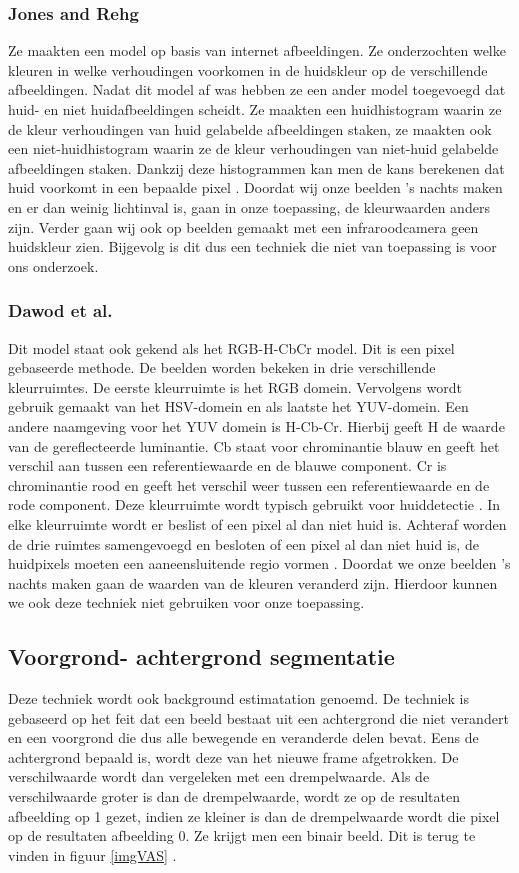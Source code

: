 \subsubsection{Jones and Rehg}
Ze maakten een model op basis van internet afbeeldingen. Ze onderzochten welke kleuren in welke verhoudingen voorkomen in de huidskleur op de verschillende afbeeldingen. Nadat dit model af was hebben ze een ander model toegevoegd dat huid- en niet huidafbeeldingen scheidt. Ze maakten een huidhistogram waarin ze de kleur verhoudingen van huid gelabelde afbeeldingen staken, ze maakten ook een niet-huidhistogram waarin ze de kleur verhoudingen van niet-huid gelabelde afbeeldingen staken. Dankzij deze histogrammen kan men de kans berekenen dat huid voorkomt in een bepaalde pixel \cite{bibTHK}. Doordat wij onze beelden 's nachts maken en er dan weinig lichtinval is, gaan in onze toepassing, de kleurwaarden anders zijn. Verder gaan wij ook op beelden gemaakt met een infraroodcamera geen huidskleur zien. Bijgevolg is dit dus een techniek die niet van toepassing is voor ons onderzoek. 

\subsubsection{Dawod et al.}
Dit model staat ook gekend als het RGB-H-CbCr model. Dit is een pixel gebaseerde methode. De beelden worden bekeken in drie verschillende kleurruimtes. De eerste kleurruimte is het RGB domein. Vervolgens wordt gebruik gemaakt van het HSV-domein en als laatste het YUV-domein. Een andere naamgeving voor het YUV domein is H-Cb-Cr. Hierbij geeft H de waarde van de gereflecteerde luminantie. Cb staat voor chrominantie blauw en geeft het verschil aan tussen een referentiewaarde en de blauwe component. Cr is chrominantie rood en geeft het verschil weer tussen een referentiewaarde en de rode component. Deze kleurruimte wordt typisch gebruikt voor huiddetectie \cite{bibDEA}. In elke kleurruimte wordt er beslist of een pixel al dan niet huid is. Achteraf worden de drie ruimtes samengevoegd en besloten of een pixel al dan niet huid is, de huidpixels moeten een aaneensluitende regio vormen \cite{bibTHK}. Doordat we onze beelden 's nachts maken gaan de waarden van de kleuren veranderd zijn. Hierdoor kunnen we ook deze techniek niet gebruiken voor onze toepassing.

\subsection{Voorgrond- achtergrond segmentatie}
\label{refBET}
Deze techniek wordt ook background estimatation genoemd. De techniek is gebaseerd op het feit dat een beeld bestaat uit een achtergrond die niet verandert en een voorgrond die dus alle bewegende en veranderde delen bevat. Eens de achtergrond bepaald is, wordt deze van het nieuwe frame afgetrokken. De verschilwaarde wordt dan vergeleken met een drempelwaarde. Als de verschilwaarde groter is dan de drempelwaarde, wordt ze op de resultaten afbeelding op 1 gezet, indien ze kleiner is dan de  drempelwaarde wordt die pixel op de resultaten afbeelding 0. Ze krijgt men een binair beeld. Dit is terug te vinden in figuur \ref{imgVAS} \cite{bibVAS}.

